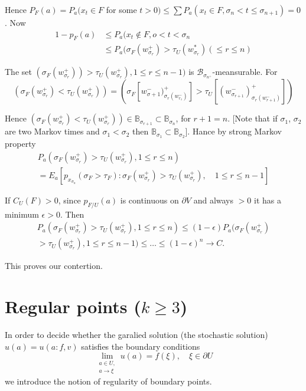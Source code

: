 Hence $P_F(a) = P_a (x_t \in F$ for some $t > 0) \leq \sum P_a (x_t
\in F, \sigma_n < t \leq \sigma_{n+1}) = 0$. Now 
\begin{align*}
  1 - p_F (a)& \leq P_a (x_t \notin F, o < t < \sigma_n \\
  &\leq P_a (\sigma _F (w^+_{\sigma_r}) > \tau _U (w^*_{\sigma_r})
  (\leq r \leq n) 
\end{align*}\pageoriginale	

The set $\left(\sigma_F(w^+_{\sigma_r})\right) > \tau_U
(w^+_{\sigma_r}), 1 \leq r \leq 
n-1)$ is $\mathcal{B}_{\sigma_{n^+}}$-meansurable. For	 
$$
(\sigma_F (w^+_{\sigma_r}) < \tau_U (w^+_{\sigma_r})) = ( \sigma_F
[w^-_{\sigma +1})^{+}_{\sigma_r (w^-_{r _1})}] > \tau_U 
[(w^-_{\sigma_{r +1}})^{+}_{\sigma_r (w^-_{r+1})}]) 
$$

Hence $(\sigma_F (w^+_{\sigma_r}) < \tau_U (w^+_{\sigma_r})) \in
\mathbb{B}_{\sigma_{r+1}} \subset \mathbb{B}_{\sigma_n}$, for $r+1= n$.
[Note that if $\sigma_1$, $\sigma_2$ are two Markov times and
  $\sigma_{1}< \sigma_2$ then $\mathbb{B}_{\sigma_1} \subset
  \mathbb{B}_{\sigma_2}$]. Hance by strong Markov property	 
\begin{multline*}
P_a (\sigma_F (w^+_{\sigma_r}) > \tau_{U}(w^+_{\sigma_r}), 1 \leq r
\leq n)\\ 
= E_a [p_{x_{\sigma_n}}(\sigma_F > \tau_F) : \sigma_F
  (w^+_{\sigma_r}) > \tau_U (w^+_{\sigma_r}),\quad 1 \leq r \leq n -1] 
\end{multline*}

If $C_U (F) > 0$, since $p_{F/U}(a)$ is continuous on $\partial V$ and
always $> 0$ it has a minimum $\epsilon> 0$. Then  
\begin{multline*}
P_a (\sigma_F(w^+_{\sigma_r}) > \tau_U(w^+_{\sigma_r}), 1 \leq r
  \leq n)\leq (1 - \epsilon) P_a (\sigma_F (w^+_{\sigma_r})\\ 
  > \tau_U
  (w^+_{\sigma_r}), 1 \leq r \leq n - 1) \leq \ldots \leq (1 - \epsilon)^n
  \rightarrow C. 
\end{multline*}

This proves our contertion.

\section{Regular points ($k \geq 3$)}\label{chap3-sec7}%

In order to decide whether the garalied solution (the stochastic
solution) $u (a) = u(a:f,v)$ satisfies the boundary conditions 
$$
\lim_{\substack{a \in U,\\ a \rightarrow \xi}} u(a) = f(\xi),\quad
\xi \in \partial U 
$$\pageoriginale
we introduce the notion of regularity of boundary points.

